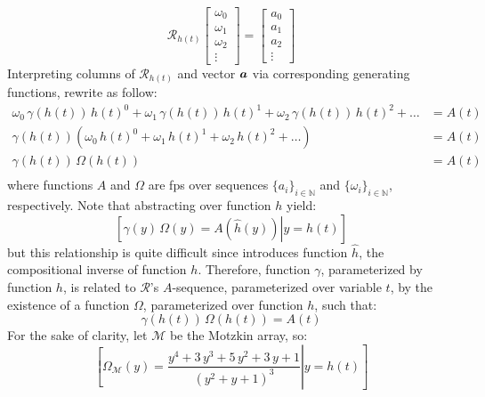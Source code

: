 \begin{displaymath}
    \mathcal{R}_{h(t)}\left[\begin{array}{c} \omega_0 \\ \omega_1 \\ \omega_2 \\ \vdots \end{array}\right] =
        \left[\begin{array}{c} a_0 \\ a_1 \\ a_2 \\ \vdots \end{array}\right]
\end{displaymath}
Interpreting columns of $\mathcal{R}_{h(t)}$ and vector $\boldsymbol{a}$ via
corresponding generating functions, rewrite as follow:
\begin{displaymath}
    \begin{split}
            \omega_0\,\gamma(h(t))\,h(t)^{0} + 
            \omega_1\,\gamma(h(t))\,h(t)^{1} + 
            \omega_2\,\gamma(h(t))\,h(t)^{2} + 
            \ldots &= A(t) \\
            \gamma(h(t))\left(\omega_0\,h(t)^{0} + 
            \omega_1\,h(t)^{1} + 
            \omega_2\,h(t)^{2} + 
            \ldots \right) &= A(t) \\
            \gamma(h(t))\,\Omega(h(t)) &= A(t) \\
    \end{split}
\end{displaymath}
where functions $A$ and $\Omega$ are \ac{fps} over sequences
$\lbrace a_i \rbrace_{i\in\mathbb{N}}$ and
$\lbrace \omega_i \rbrace_{i\in\mathbb{N}}$, respectively. Note that abstracting
over function $h$ yield:
\begin{displaymath}
    \left.\left[
        \gamma(y)\,\Omega(y) = A(\hat{h}(y)) \right| y = h(t) \right]
\end{displaymath}
but this relationship is quite difficult since introduces function $\hat{h}$,
the compositional inverse of function $h$. Therefore, function
$\gamma$, parameterized by function $h$, is related to $\mathcal{R}$'s
$A$-sequence, parameterized over variable $t$, by the existence of 
a function $\Omega$, parameterized over function $h$, such that:
\begin{displaymath}
    \gamma(h(t))\,\Omega(h(t)) = A(t) 
\end{displaymath}
For the sake of clarity, let $\mathcal{M}$ be the Motzkin array, so:
\begin{displaymath}
        \left.\left[
            \Omega_{\mathcal{M}}(y) = \frac{y^{4} + 3 \, y^{3} + 5 \, y^{2} + 3 \, y + 1}{{\left(y^{2} + y + 1\right)}^{3}}
                \right| y = h(t) \right]
\end{displaymath}
